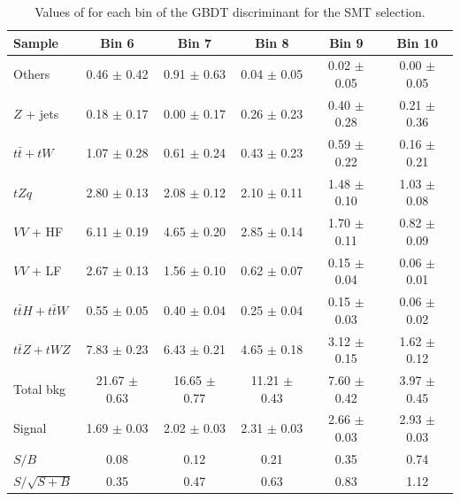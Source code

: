 \begin{table}[!h]
	\centering
	\small
\begin{tabular}{|l|c|c|c|c|c|} 
	\hline 
	Sample 			       & Bin 6            & Bin 7            & Bin 8             & Bin 9           & Bin 10          \\ 
	\hline                 
	Others & 0.46 $\pm$ 0.42 & 0.91 $\pm$ 0.63 & 0.04 $\pm$ 0.05 & 0.02 $\pm$ 0.05 & 0.00 $\pm$ 0.05 \\ 
	$Z$ + jets & 0.18 $\pm$ 0.17 & 0.00 $\pm$ 0.17 & 0.26 $\pm$ 0.23 & 0.40 $\pm$ 0.28 & 0.21 $\pm$ 0.36 \\ 
	$t\bar{t}+tW$ & 1.07 $\pm$ 0.28 & 0.61 $\pm$ 0.24 & 0.43 $\pm$ 0.23 & 0.59 $\pm$ 0.22 & 0.16 $\pm$ 0.21 \\ 
	$tZq$ & 2.80 $\pm$ 0.13 & 2.08 $\pm$ 0.12 & 2.10 $\pm$ 0.11 & 1.48 $\pm$ 0.10 & 1.03 $\pm$ 0.08 \\ 
	$VV$ + HF & 6.11 $\pm$ 0.19 & 4.65 $\pm$ 0.20 & 2.85 $\pm$ 0.14 & 1.70 $\pm$ 0.11 & 0.82 $\pm$ 0.09 \\ 
	$VV$ + LF & 2.67 $\pm$ 0.13 & 1.56 $\pm$ 0.10 & 0.62 $\pm$ 0.07 & 0.15 $\pm$ 0.04 & 0.06 $\pm$ 0.01 \\ 
	$t\bar{t}H+t\bar{t}W$ & 0.55 $\pm$ 0.05 & 0.40 $\pm$ 0.04 & 0.25 $\pm$ 0.04 & 0.15 $\pm$ 0.03 & 0.06 $\pm$ 0.02 \\ 
	$t\bar{t}Z+tWZ$ & 7.83 $\pm$ 0.23 & 6.43 $\pm$ 0.21 & 4.65 $\pm$ 0.18 & 3.12 $\pm$ 0.15 & 1.62 $\pm$ 0.12 \\ 
	\hline 
	Total bkg & 21.67 $\pm$ 0.63 & 16.65 $\pm$ 0.77 & 11.21 $\pm$ 0.43 & 7.60 $\pm$ 0.42 & 3.97 $\pm$ 0.45 \\ 
	\hline 
	Signal & 1.69 $\pm$ 0.03 & 2.02 $\pm$ 0.03 & 2.31 $\pm$ 0.03 & 2.66 $\pm$ 0.03 & 2.93 $\pm$ 0.03 \\ 
	\hline 
	$S/B$ & 0.08 & 0.12 & 0.21 & 0.35 & 0.74 \\ 
	$S/\sqrt{S+B}$ & 0.35 & 0.47 & 0.63 & 0.83 & 1.12 \\ 
	\hline 
\end{tabular} 
	\caption{Values of \ssplusb for each bin of the GBDT discriminant for the SMT selection.}%
\label{tab:yields:sr3_smt_bdt}
\end{table}

